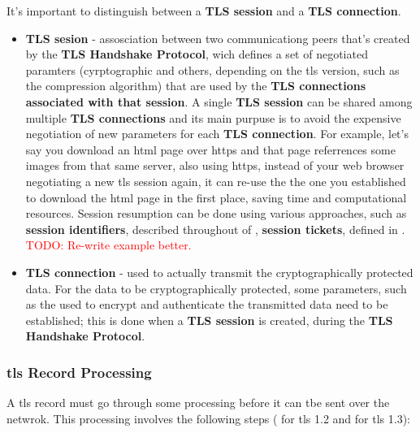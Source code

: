 \documentclass{llncs}
\newcommand{\todo}[1]{\textcolor{red}{TODO: #1}\PackageWarning{TODO:}{#1!}}
\begin{document}
It's important to distinguish between a \textbf{TLS session} and a \textbf{TLS connection}.
\begin{itemize}
  \item \textbf{TLS sesion} - assosciation between two communicationg peers that's
  created by the \textbf{TLS Handshake Protocol}, wich defines a set of negotiated paramters
  (cyrptographic and others, depending on the \gls{tls} version, such as
  the compression algorithm) that are used by the \textbf{TLS connections associated
  with that session}. A single \textbf{TLS session} can be shared among multiple
  \textbf{TLS connections} and its main purpuse is to avoid the expensive negotiation
  of new parameters for each \textbf{TLS connection}. For example, let's say
  you download an \gls{html} page over \gls{https} and that page referrences
  some images from that same server, also using \gls{https}, instead of your
  web browser negotiating a new \gls{tls} session again, it can re-use the the
  one you established to download the \gls{html} page in the first place,
  saving time and computational resources. Session resumption can be done using various
  approaches, such as \textbf{session identifiers}, described throughout 
  of  \cite{RFC5246}, \textbf{session tickets}, defined in
   \cite{RFC5077}. \todo{Re-write example better.}
  \item \textbf{TLS connection} - used to actually transmit the cryptographically
  protected data. For the data to be cryptographically protected, some parameters,
  such as the  used to encrypt and authenticate the transmitted
  data need to be established; this is done when a \textbf{TLS session} is created,
  during the \textbf{TLS Handshake Protocol}.
\end{itemize}

\subsubsection{\gls{tls} Record Processing}
A \gls{tls} record must go through some processing before it can tbe sent over the netwrok.
This processing involves the following steps ( for \gls{tls} 1.2 and  for \gls{tls} 1.3):
\end{document}

